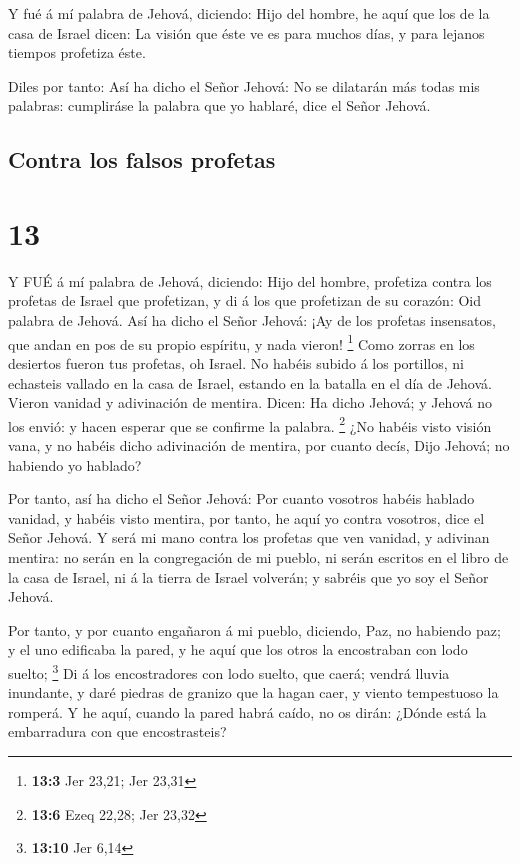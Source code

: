  Y fué á mí palabra de Jehová, diciendo:  Hijo
del hombre, he aquí que los de la casa de Israel dicen: La visión que
éste ve es para muchos días, y para lejanos tiempos profetiza éste.

 Diles por tanto: Así ha dicho el Señor Jehová: No se
dilatarán más todas mis palabras: cumpliráse la palabra que yo hablaré,
dice el Señor Jehová.

\hypertarget{contra-los-falsos-profetas}{%
\subsection{Contra los falsos
profetas}\label{contra-los-falsos-profetas}}

\hypertarget{section-12}{%
\section{13}\label{section-12}}

 Y FUÉ á mí palabra de Jehová, diciendo:  Hijo
del hombre, profetiza contra los profetas de Israel que profetizan, y di
á los que profetizan de su corazón: Oid palabra de Jehová. 
Así ha dicho el Señor Jehová: ¡Ay de los profetas insensatos, que andan
en pos de su propio espíritu, y nada vieron! \footnote{\textbf{13:3} Jer
  23,21; Jer 23,31}  Como zorras en los desiertos fueron tus
profetas, oh Israel.  No habéis subido á los portillos, ni
echasteis vallado en la casa de Israel, estando en la batalla en el día
de Jehová.  Vieron vanidad y adivinación de mentira. Dicen:
Ha dicho Jehová; y Jehová no los envió: y hacen esperar que se confirme
la palabra. \footnote{\textbf{13:6} Ezeq 22,28; Jer 23,32} 
¿No habéis visto visión vana, y no habéis dicho adivinación de mentira,
por cuanto decís, Dijo Jehová; no habiendo yo hablado?

 Por tanto, así ha dicho el Señor Jehová: Por cuanto
vosotros habéis hablado vanidad, y habéis visto mentira, por tanto, he
aquí yo contra vosotros, dice el Señor Jehová.  Y será mi
mano contra los profetas que ven vanidad, y adivinan mentira: no serán
en la congregación de mi pueblo, ni serán escritos en el libro de la
casa de Israel, ni á la tierra de Israel volverán; y sabréis que yo soy
el Señor Jehová.

 Por tanto, y por cuanto engañaron á mi pueblo, diciendo,
Paz, no habiendo paz; y el uno edificaba la pared, y he aquí que los
otros la encostraban con lodo suelto; \footnote{\textbf{13:10} Jer 6,14}
 Di á los encostradores con lodo suelto, que caerá; vendrá
lluvia inundante, y daré piedras de granizo que la hagan caer, y viento
tempestuoso la romperá.  Y he aquí, cuando la pared habrá
caído, no os dirán: ¿Dónde está la embarradura con que encostrasteis?

